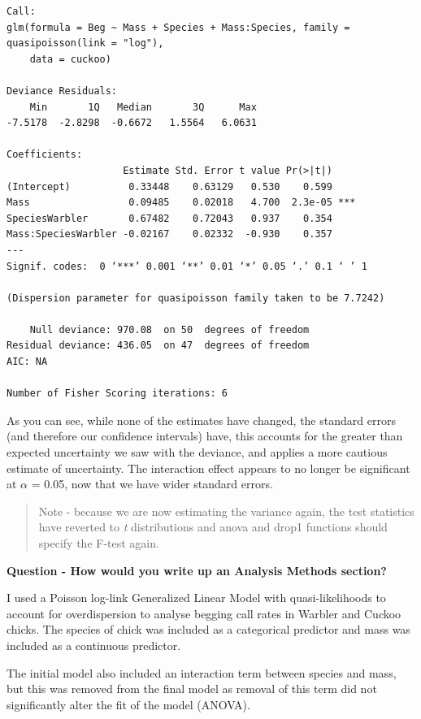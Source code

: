 \documentclass[
]{book}
\begin{document}
\begin{verbatim}
Call:
glm(formula = Beg ~ Mass + Species + Mass:Species, family = quasipoisson(link = "log"), 
    data = cuckoo)

Deviance Residuals: 
    Min       1Q   Median       3Q      Max  
-7.5178  -2.8298  -0.6672   1.5564   6.0631  

Coefficients:
                    Estimate Std. Error t value Pr(>|t|)    
(Intercept)          0.33448    0.63129   0.530    0.599    
Mass                 0.09485    0.02018   4.700  2.3e-05 ***
SpeciesWarbler       0.67482    0.72043   0.937    0.354    
Mass:SpeciesWarbler -0.02167    0.02332  -0.930    0.357    
---
Signif. codes:  0 ‘***’ 0.001 ‘**’ 0.01 ‘*’ 0.05 ‘.’ 0.1 ‘ ’ 1

(Dispersion parameter for quasipoisson family taken to be 7.7242)

    Null deviance: 970.08  on 50  degrees of freedom
Residual deviance: 436.05  on 47  degrees of freedom
AIC: NA

Number of Fisher Scoring iterations: 6
\end{verbatim}

As you can see, while none of the estimates have changed, the standard errors (and therefore our confidence intervals) have, this accounts for the greater than expected uncertainty we saw with the deviance, and applies a more cautious estimate of uncertainty. The interaction effect appears to no longer be significant at \(\alpha\) = 0.05, now that we have wider standard errors.

\begin{quote}
Note - because we are now estimating the variance again, the test statistics have reverted to \emph{t} distributions and anova and drop1 functions should specify the F-test again.
\end{quote}

\textbf{Question - How would you write up an Analysis Methods section?}

I used a Poisson log-link Generalized Linear Model with quasi-likelihoods to account for overdispersion to analyse begging call rates in Warbler and Cuckoo chicks. The species of chick was included as a categorical predictor and mass was included as a continuous predictor.

The initial model also included an interaction term between species and mass, but this was removed from the final model as removal of this term did not significantly alter the fit of the model (ANOVA).
\end{document}

